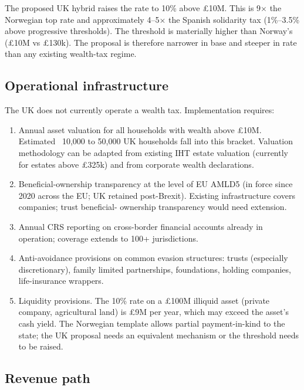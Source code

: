 \documentclass[11pt]{article}
\begin{document}
The proposed UK hybrid raises the rate to 10\% above \pounds 10M.
This is 9$\times$ the Norwegian top rate and approximately 4--5$\times$
the Spanish solidarity tax (1\%--3.5\% above progressive
thresholds).  The threshold is materially higher than Norway's
(\pounds 10M vs \pounds 130k).  The proposal is therefore narrower
in base and steeper in rate than any existing wealth-tax regime.

\subsection{Operational infrastructure}

The UK does not currently operate a wealth tax.  Implementation
requires:

\begin{enumerate}
\item Annual asset valuation for all households with wealth above
\pounds 10M.  Estimated ~10,000 to 50,000 UK households fall into
this bracket.  Valuation methodology can be adapted from existing
IHT estate valuation (currently for estates above \pounds 325k)
and from corporate wealth declarations.

\item Beneficial-ownership transparency at the level of EU AMLD5
(in force since 2020 across the EU; UK retained post-Brexit).
Existing infrastructure covers companies; trust beneficial-
ownership transparency would need extension.

\item Annual CRS reporting on cross-border financial accounts
already in operation; coverage extends to 100+ jurisdictions.

\item Anti-avoidance provisions on common evasion structures:
trusts (especially discretionary), family limited partnerships,
foundations, holding companies, life-insurance wrappers.

\item Liquidity provisions.  The 10\% rate on a \pounds 100M
illiquid asset (private company, agricultural land) is \pounds 9M
per year, which may exceed the asset's cash yield.  The Norwegian
template allows partial payment-in-kind to the state; the UK
proposal needs an equivalent mechanism or the threshold needs to
be raised.
\end{enumerate}

\subsection{Revenue path}
\end{document}
